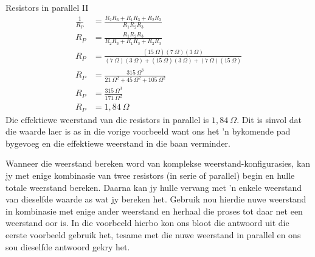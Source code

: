 \begin{wex}{Resistors in parallel II}
{\begin{align*}
\frac{1}{R_P}&=\frac{R_2R_3+R_1R_3+R_2R_3}{R_1R_2R_3}\\ 
R_P&=\frac{R_1R_2R_3}{R_2R_3+R_1R_3+R_2R_3}\\ 
R_P&=\frac{(15~\Omega)(7~\Omega)(3~\Omega)}{
(7~\Omega)(3~\Omega)+(15~\Omega)(3~\Omega)+(7~\Omega)(15~\Omega)}\\ 
R_P&=\frac{315~\Omega^3}{21~\Omega^2+45~\Omega^2+105~\Omega^2}\\ 
R_P&=\frac{315~\Omega^3}{171~\Omega^2}\\ 
R_P&=1,84~\Omega
\end{align*}
Die effektiewe weerstand van die resistors in parallel is $1,84~\Omega$. Dit is
sinvol dat die waarde laer is as in die vorige voorbeeld want ons het 'n
bykomende pad bygevoeg en die effektiewe weerstand in die baan
verminder.}\end{wex}

Wanneer die weerstand bereken word van komplekse weerstand-konfigurasies, kan
jy met enige kombinasie van twee resistors (in serie of parallel) begin en
hulle totale weerstand bereken. Daarna kan jy hulle vervang met 'n enkele
weerstand van dieselfde waarde as wat jy bereken het. Gebruik nou hierdie nuwe
weerstand in kombinasie met enige ander weerstand en herhaal die proses tot
daar net een weerstand oor is. In die voorbeeld hierbo kon ons bloot die
antwoord uit die eerste voorbeeld gebruik het, tesame met die nuwe weerstand in
parallel en ons sou dieselfde antwoord gekry het.

